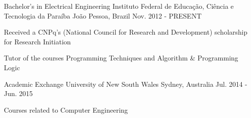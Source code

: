 

\begin{cventries}

  \cventry
    {Bachelor's in Electrical Engineering} %
    {Instituto Federal de Educação, Ciência e Tecnologia da Paraíba} %
    {João Pessoa, Brazil} %
    {Nov. 2012 - PRESENT} %
    {
	\begin{cvitems} %
		\item {Received a CNPq's (National Council for Research and Development) scholarship for Research Initiation}
        \item {Tutor of the courses Programming Techniques and Algorithm \& Programming Logic}
	\end{cvitems}
    }

    \cventry
    {Academic Exchange}
    {University of New South Wales}
    {Sydney, Australia}
    {Jul. 2014 - Jun. 2015}
    {
		\begin{cvitems} %
        	\item {Courses related to Computer Engineering}
        \end{cvitems}
    }


\end{cventries}
